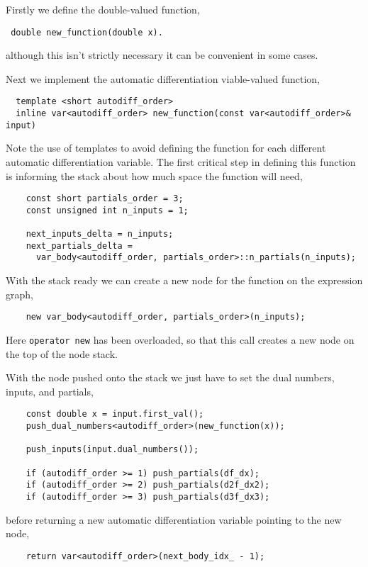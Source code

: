 Firstly we define the double-valued function,
%
\begin{verbatim}
 double new_function(double x).
\end{verbatim}
%
although this isn't strictly necessary it can be convenient in some cases.

Next we implement the automatic differentiation viable-valued function,
%
\begin{verbatim}
  template <short autodiff_order>
  inline var<autodiff_order> new_function(const var<autodiff_order>& input)
\end{verbatim}
%
Note the use of templates to avoid defining the function for each different
automatic differentiation variable.  The first critical step in defining this
function is informing the stack about how much space the function will need,
%
\begin{verbatim}
    const short partials_order = 3;
    const unsigned int n_inputs = 1;
    
    next_inputs_delta = n_inputs;
    next_partials_delta =
      var_body<autodiff_order, partials_order>::n_partials(n_inputs);
\end{verbatim}
%
With the stack ready we can create a new node for the function on the
expression graph,
%
\begin{verbatim}
    new var_body<autodiff_order, partials_order>(n_inputs);
\end{verbatim}
%
Here \verb|operator new| has been overloaded, so that this call creates
a new node on the top of the node stack.

With the node pushed onto the stack we just have to set the dual numbers,
inputs, and partials,
%
\begin{verbatim}
    const double x = input.first_val();
    push_dual_numbers<autodiff_order>(new_function(x));
    
    push_inputs(input.dual_numbers());
    
    if (autodiff_order >= 1) push_partials(df_dx);
    if (autodiff_order >= 2) push_partials(d2f_dx2);
    if (autodiff_order >= 3) push_partials(d3f_dx3);
\end{verbatim}
%
before returning a new automatic differentiation variable pointing to the new
node,
%
\begin{verbatim}
    return var<autodiff_order>(next_body_idx_ - 1);
\end{verbatim}

